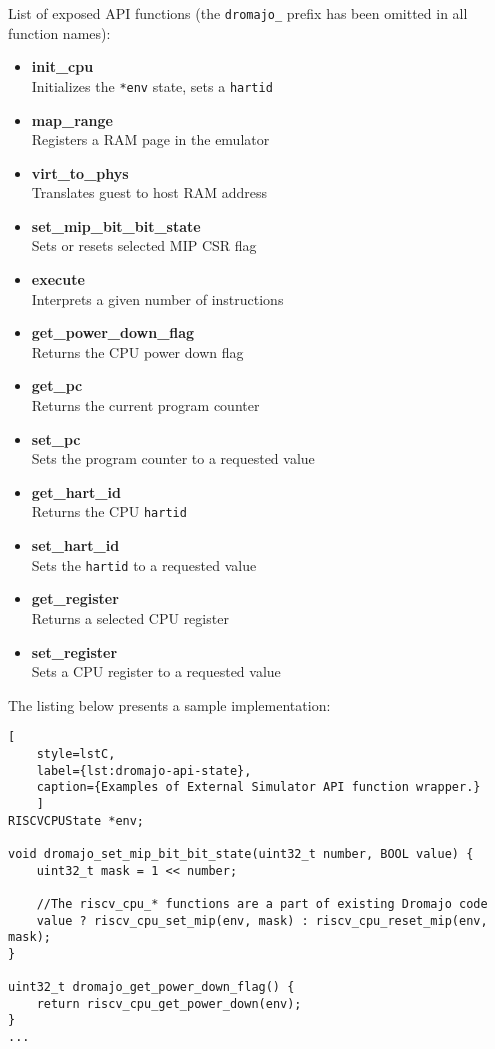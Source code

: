 \vspace{10px}
\noindent
List of exposed API functions (the \texttt{dromajo\_} prefix has been omitted in all function names):
\begin{multicols}{2}
    \begin{itemize}
        \item{\textbf{init\_cpu}\\Initializes the \texttt{*env} state, sets a \texttt{hartid} }
        \item{\textbf{map\_range}\\Registers a RAM page in the emulator}
        \item{\textbf{virt\_to\_phys}\\Translates guest to host RAM address}
        \item{\textbf{set\_mip\_bit\_bit\_state}\\Sets or resets selected MIP CSR flag}
        \item{\textbf{execute}\\Interprets a given number of instructions} %
        \item{\textbf{get\_power\_down\_flag}\\Returns the CPU power down flag}
        \item{\textbf{get\_pc}\\Returns the current program counter}
        \item{\textbf{set\_pc}\\Sets the program counter to a requested value}
        \item{\textbf{get\_hart\_id}\\Returns the CPU \texttt{hartid}}
        \item{\textbf{set\_hart\_id}\\Sets the \texttt{hartid} to a requested value}
        \item{\textbf{get\_register}\\Returns a selected CPU register}
        \item{\textbf{set\_register}\\Sets a CPU register to a requested value}
    \end{itemize}
\end{multicols}

\noindent
The listing below presents a sample implementation:

\begin{lstlisting}[
    style=lstC,
    label={lst:dromajo-api-state},
    caption={Examples of External Simulator API function wrapper.}
    ]
RISCVCPUState *env;

void dromajo_set_mip_bit_bit_state(uint32_t number, BOOL value) {
    uint32_t mask = 1 << number;

    //The riscv_cpu_* functions are a part of existing Dromajo code
    value ? riscv_cpu_set_mip(env, mask) : riscv_cpu_reset_mip(env, mask);
}

uint32_t dromajo_get_power_down_flag() {
    return riscv_cpu_get_power_down(env);
}
...
\end{lstlisting}

